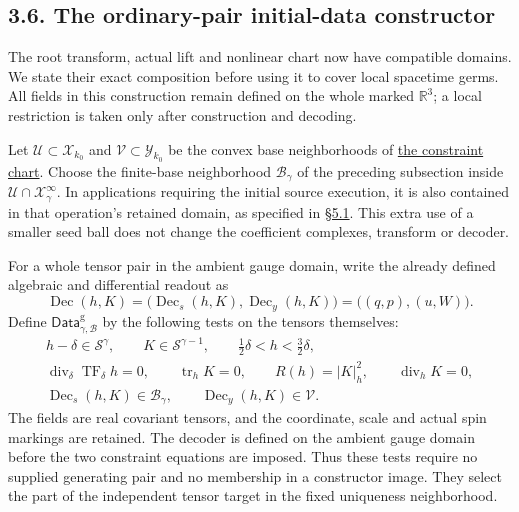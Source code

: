 \documentclass[
  english,
  11pt,
  reqno]{amsart}
\begin{document}
\subsection{3.6. The ordinary-pair initial-data
constructor}\label{the-ordinary-pair-initial-data-constructor}\label{sec:online-ordinary-data-construction}

The root transform, actual lift and nonlinear chart now have compatible
domains. We state their exact composition before using it to cover local
spacetime germs. All fields in this construction remain defined on the
whole marked \(\mathbb R^3\); a local restriction is taken only after
construction and decoding.

Let \(\mathcal U\subset\mathcal X_{k_0}\) and
\(\mathcal V\subset\mathcal Y_{k_0}\) be the convex base neighborhoods
of \hyperref[thm:online-chart-base-constraint-bijection]{the constraint
chart}. Choose the finite-base neighborhood \(\mathcal B_\gamma\) of the
preceding subsection inside \(\mathcal U\cap\mathcal X^\infty_\gamma\).
In applications requiring the initial source execution, it is also
contained in that operation's retained domain, as specified in
\hyperref[sec:submission-coverage-conventions]{§5.1}. This extra use of
a smaller seed ball does not change the coefficient complexes, transform
or decoder.

For a whole tensor pair in the ambient gauge domain, write the already
defined algebraic and differential readout as%
 \[
\operatorname{Dec}(h,K)
=\bigl(\operatorname{Dec}_{s}(h,K),
       \operatorname{Dec}_{y}(h,K)\bigr)
=\bigl((q,p),(u,W)\bigr).
\] Define \(\mathsf{Data}^{\mathrm g}_{\gamma,\mathcal B}\) by the
following tests on the tensors themselves:%
 \[
\begin{gathered}
h-\delta\in\mathscr S^\gamma,
\qquad K\in\mathscr S^{\gamma-1},
\qquad \tfrac12\delta<h<\tfrac32\delta,\\
\operatorname{div}_\delta\operatorname{TF}_\delta h=0,
\qquad \operatorname{tr}_hK=0,
\qquad R(h)=|K|_h^2,
\qquad\operatorname{div}_hK=0,\\
\operatorname{Dec}_{s}(h,K)\in\mathcal B_\gamma,
\qquad\operatorname{Dec}_{y}(h,K)\in\mathcal V.
\end{gathered}
\] The fields are real covariant tensors, and the coordinate, scale and
actual spin markings are retained. The decoder is defined on the ambient
gauge domain before the two constraint equations are imposed. Thus these
tests require no supplied generating pair and no membership in a
constructor image. They select the part of the independent tensor target
in the fixed uniqueness neighborhood.
\end{document}
